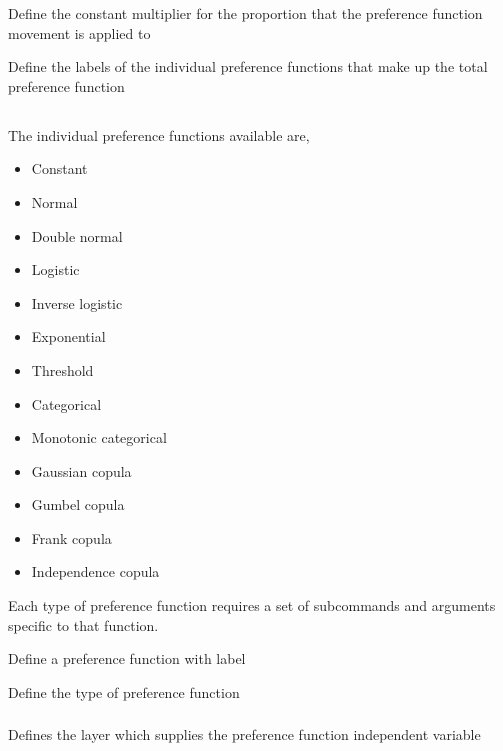  {Define the constant multiplier for the proportion that the preference function movement is applied to}

 {Define the labels of the individual  preference functions that make up the total preference function}

\subsection{}

The individual preference functions available are,

\begin{itemize}
	\item Constant
	\item Normal
	\item Double normal
	\item Logistic
	\item Inverse logistic
	\item Exponential
	\item Threshold
	\item Categorical
	\item Monotonic categorical
	\item Gaussian copula
	\item Gumbel copula
	\item Frank copula
	\item Independence copula
\end{itemize}

Each type of preference function requires a set of subcommands and arguments specific to that function.

 {Define a preference function with label}

 {Define the type of preference function}

\subsubsection[Constant]{}

 {Defines the layer which supplies the preference function independent variable}

